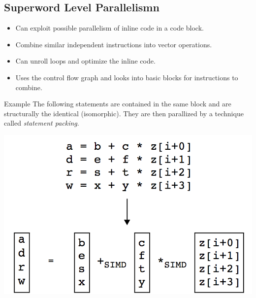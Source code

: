 \documentclass[]{beamer}
\begin{document}

\subsection{Superword Level Parallelismn}

\begin{frame}{}
\begin{itemize}
  \item Can exploit possible parallelism of inline code in a code block.
  \item Combine similar independent instructions into vector operations.
  \item Can unroll loops and optimize the inline code.
  \item Uses the control flow graph and looks into basic blocks for instructions to combine.
\end{itemize}
\end{frame}



\begin{frame}{Example}
The following statements are contained in the same block and are structurally the identical
(isomorphic). They are then parallized by a technique called \textit{statement packing}. 
\begin{center}
    \includegraphics[width=.8\textwidth]{pictures/slp_example}
\end{center}
\end{frame}

\end{document}
